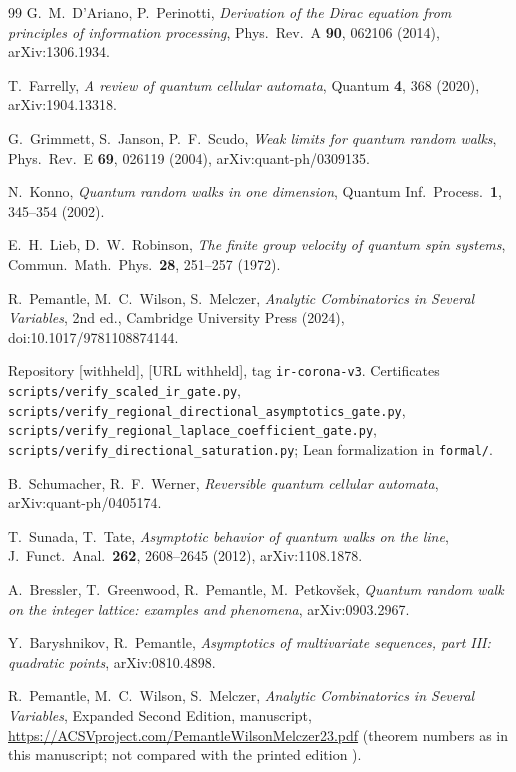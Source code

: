 \documentclass[11pt]{amsart}
\theoremstyle{definition}
\theoremstyle{remark}
\begin{document}
\begin{thebibliography}{99}
G.~M.~D'Ariano, P.~Perinotti,
\emph{Derivation of the Dirac equation from principles of information processing},
Phys.\ Rev.\ A \textbf{90}, 062106 (2014), arXiv:1306.1934.

T.~Farrelly,
\emph{A review of quantum cellular automata},
Quantum \textbf{4}, 368 (2020), arXiv:1904.13318.

G.~Grimmett, S.~Janson, P.~F.~Scudo,
\emph{Weak limits for quantum random walks},
Phys.\ Rev.\ E \textbf{69}, 026119 (2004), arXiv:quant-ph/0309135.

N.~Konno,
\emph{Quantum random walks in one dimension},
Quantum Inf.\ Process.\ \textbf{1}, 345--354 (2002).

E.~H.~Lieb, D.~W.~Robinson,
\emph{The finite group velocity of quantum spin systems},
Commun.\ Math.\ Phys.\ \textbf{28}, 251--257 (1972).

R.~Pemantle, M.~C.~Wilson, S.~Melczer,
\emph{Analytic Combinatorics in Several Variables}, 2nd ed.,
Cambridge University Press (2024), doi:10.1017/9781108874144.

Repository [withheld],
[URL withheld], tag
\texttt{ir-corona-v3}.
Certificates
\texttt{scripts/verify\_scaled\_ir\_gate.py},
\texttt{scripts/verify\_regional\_directional\_asymptotics\_gate.py},
\texttt{scripts/verify\_regional\_laplace\_coefficient\_gate.py},
\texttt{scripts/verify\_directional\_saturation.py}; Lean formalization in
\texttt{formal/}.

B.~Schumacher, R.~F.~Werner,
\emph{Reversible quantum cellular automata},
arXiv:quant-ph/0405174.

T.~Sunada, T.~Tate,
\emph{Asymptotic behavior of quantum walks on the line},
J.\ Funct.\ Anal.\ \textbf{262}, 2608--2645 (2012), arXiv:1108.1878.

A.~Bressler, T.~Greenwood, R.~Pemantle, M.~Petkov\v{s}ek,
\emph{Quantum random walk on the integer lattice: examples and phenomena},
arXiv:0903.2967.

Y.~Baryshnikov, R.~Pemantle,
\emph{Asymptotics of multivariate sequences, part III: quadratic points},
arXiv:0810.4898.

R.~Pemantle, M.~C.~Wilson, S.~Melczer,
\emph{Analytic Combinatorics in Several Variables}, Expanded Second Edition,
manuscript, \url{https://ACSVproject.com/PemantleWilsonMelczer23.pdf}
(theorem numbers as in this manuscript; not compared with the printed
edition \cite{ACSV}).

\end{thebibliography}
\end{document}
